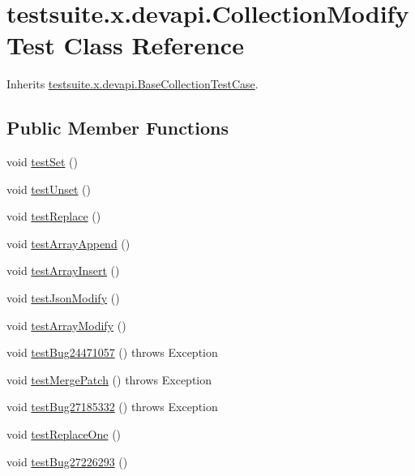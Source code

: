 \hypertarget{classtestsuite_1_1x_1_1devapi_1_1_collection_modify_test}{}\section{testsuite.\+x.\+devapi.\+Collection\+Modify\+Test Class Reference}
\label{classtestsuite_1_1x_1_1devapi_1_1_collection_modify_test}


Inherits \mbox{\hyperlink{classtestsuite_1_1x_1_1devapi_1_1_base_collection_test_case}{testsuite.\+x.\+devapi.\+Base\+Collection\+Test\+Case}}.

\subsection*{Public Member Functions}
\begin{DoxyCompactItemize}
\item 
void \mbox{\hyperlink{classtestsuite_1_1x_1_1devapi_1_1_collection_modify_test_a0a3cbc1056f520b18f4bf654516d1360}{test\+Set}} ()
\item 
void \mbox{\hyperlink{classtestsuite_1_1x_1_1devapi_1_1_collection_modify_test_ac3f16afaae76fea54241dcceb95866ad}{test\+Unset}} ()
\item 
void \mbox{\hyperlink{classtestsuite_1_1x_1_1devapi_1_1_collection_modify_test_a5553026c0529ceac40378b94e7f4cf28}{test\+Replace}} ()
\item 
void \mbox{\hyperlink{classtestsuite_1_1x_1_1devapi_1_1_collection_modify_test_a75fd1459b274e03b42fbe2afb9f589cb}{test\+Array\+Append}} ()
\item 
void \mbox{\hyperlink{classtestsuite_1_1x_1_1devapi_1_1_collection_modify_test_aa59954c7aaf6b8b01ccb2be430b57baf}{test\+Array\+Insert}} ()
\item 
void \mbox{\hyperlink{classtestsuite_1_1x_1_1devapi_1_1_collection_modify_test_a099b7a8de6fa77570593c1b91c2353c3}{test\+Json\+Modify}} ()
\item 
void \mbox{\hyperlink{classtestsuite_1_1x_1_1devapi_1_1_collection_modify_test_add14a398f1c5cc868ac820b4a844a82d}{test\+Array\+Modify}} ()
\item 
void \mbox{\hyperlink{classtestsuite_1_1x_1_1devapi_1_1_collection_modify_test_a839d9c17b30c3aad89263ab9b9067d17}{test\+Bug24471057}} ()  throws Exception 
\item 
void \mbox{\hyperlink{classtestsuite_1_1x_1_1devapi_1_1_collection_modify_test_a5b107907f1fb51a6cd9c7d29f512188b}{test\+Merge\+Patch}} ()  throws Exception 
\item 
void \mbox{\hyperlink{classtestsuite_1_1x_1_1devapi_1_1_collection_modify_test_a79ce15468c74ab5ca0b7aaed0ed9ccca}{test\+Bug27185332}} ()  throws Exception 
\item 
void \mbox{\hyperlink{classtestsuite_1_1x_1_1devapi_1_1_collection_modify_test_ae64df2017c3e3c1becad1d9199a4ea9c}{test\+Replace\+One}} ()
\item 
void \mbox{\hyperlink{classtestsuite_1_1x_1_1devapi_1_1_collection_modify_test_a6d0ae2734e78f28c26e4fdcf1e8d4235}{test\+Bug27226293}} ()
\end{DoxyCompactItemize}
